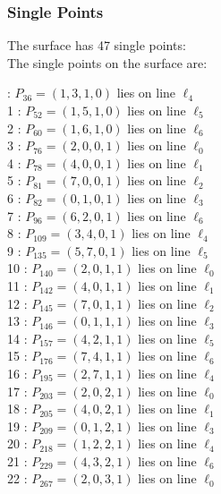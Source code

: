 \documentclass{article}
\begin{document}
{\subsubsection*{Single Points}
The surface has 47 single points:\\
The single points on the surface are:\\
\begin{multicols}{2}
 : $P_{36}=( 1, 3, 1, 0 )$ lies on line $\ell_{4}$\\
1 : $P_{52}=( 1, 5, 1, 0 )$ lies on line $\ell_{5}$\\
2 : $P_{60}=( 1, 6, 1, 0 )$ lies on line $\ell_{6}$\\
3 : $P_{76}=( 2, 0, 0, 1 )$ lies on line $\ell_{0}$\\
4 : $P_{78}=( 4, 0, 0, 1 )$ lies on line $\ell_{1}$\\
5 : $P_{81}=( 7, 0, 0, 1 )$ lies on line $\ell_{2}$\\
6 : $P_{82}=( 0, 1, 0, 1 )$ lies on line $\ell_{3}$\\
7 : $P_{96}=( 6, 2, 0, 1 )$ lies on line $\ell_{6}$\\
8 : $P_{109}=( 3, 4, 0, 1 )$ lies on line $\ell_{4}$\\
9 : $P_{135}=( 5, 7, 0, 1 )$ lies on line $\ell_{5}$\\
10 : $P_{140}=( 2, 0, 1, 1 )$ lies on line $\ell_{0}$\\
11 : $P_{142}=( 4, 0, 1, 1 )$ lies on line $\ell_{1}$\\
12 : $P_{145}=( 7, 0, 1, 1 )$ lies on line $\ell_{2}$\\
13 : $P_{146}=( 0, 1, 1, 1 )$ lies on line $\ell_{3}$\\
14 : $P_{157}=( 4, 2, 1, 1 )$ lies on line $\ell_{5}$\\
15 : $P_{176}=( 7, 4, 1, 1 )$ lies on line $\ell_{6}$\\
16 : $P_{195}=( 2, 7, 1, 1 )$ lies on line $\ell_{4}$\\
17 : $P_{203}=( 2, 0, 2, 1 )$ lies on line $\ell_{0}$\\
18 : $P_{205}=( 4, 0, 2, 1 )$ lies on line $\ell_{1}$\\
19 : $P_{209}=( 0, 1, 2, 1 )$ lies on line $\ell_{3}$\\
20 : $P_{218}=( 1, 2, 2, 1 )$ lies on line $\ell_{4}$\\
21 : $P_{229}=( 4, 3, 2, 1 )$ lies on line $\ell_{6}$\\
22 : $P_{267}=( 2, 0, 3, 1 )$ lies on line $\ell_{0}$\\

\end{multicols}}
\end{document}
